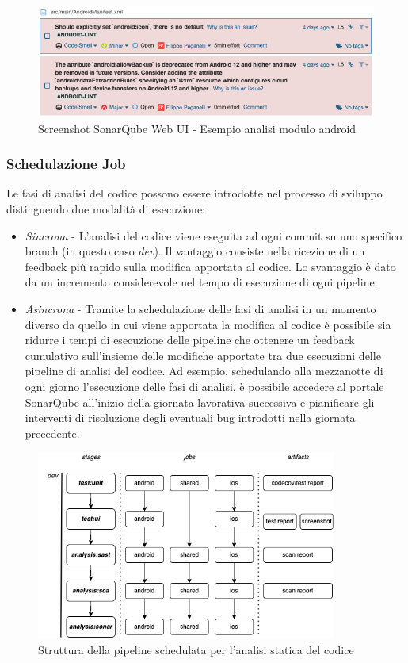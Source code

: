 \begin{figure}[H]
\centering
\includegraphics[width=1\textwidth]{img/Screenshot 2022-06-21 at 09.58.58.png}
\caption{Screenshot SonarQube Web UI - Esempio analisi modulo android}
\end{figure}

\subsubsection{Schedulazione Job}
Le fasi di analisi del codice possono essere introdotte nel processo di sviluppo distinguendo due modalità di esecuzione:
\begin{itemize}
    \item \textit{Sincrona} - L'analisi del codice viene eseguita ad ogni commit su uno specifico branch (in questo caso \textit{dev}). Il vantaggio consiste nella ricezione di un feedback più rapido sulla modifica apportata al codice. Lo svantaggio è dato da un incremento considerevole nel tempo di esecuzione di ogni pipeline.
    \item \textit{Asincrona} - Tramite la schedulazione delle fasi di analisi in un momento diverso da quello in cui viene apportata la modifica al codice è possibile sia ridurre i tempi di esecuzione delle pipeline che ottenere un feedback cumulativo sull'insieme delle modifiche apportate tra due esecuzioni delle pipeline di analisi del codice. Ad esempio, schedulando alla mezzanotte di ogni giorno l'esecuzione delle fasi di analisi, è possibile accedere al portale SonarQube all'inizio della giornata lavorativa successiva e pianificare gli interventi di risoluzione degli eventuali bug introdotti nella giornata precedente.
\end{itemize}

\begin{figure}[H]
\centering
\includegraphics[width=0.88\textwidth]{img/tesi-16-cicd-scheduled.drawio.png}
\caption{Struttura della pipeline schedulata per l'analisi statica del codice}
\end{figure}

